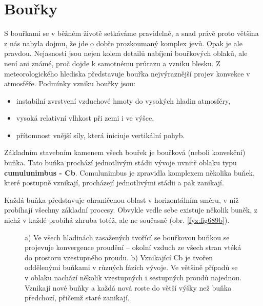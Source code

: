   \section{Bouřky}\label{fyz:IIchapIXsecIV}   
    S bouřkami se v běžném životě setkáváme pravidelně, a snad právě proto většina z nás nabyla
    dojmu, že jde o dobře prozkoumaný komplex jevů. Opak je ale pravdou. Nejasnosti jsou nejen kolem
    detailů nabíjení bouřkových oblaků, ale není ani známé, proč dojde k samotnému průrazu a vzniku
    blesku. Z meteorologického hlediska představuje bouřka nejvýraznější projev konvekce v
    atmosféře. Podmínky vzniku bouřky jsou:
    \begin{itemize}[noitemsep]
      \item instabilní zvrstvení vzduchové hmoty do vysokých hladin atmosféry,
      \item vysoká relativní vlhkost při zemi i ve výšce,
      \item přítomnost vnější síly, která iniciuje vertikální pohyb.
    \end{itemize}
    Základním stavebním kamenem všech bouřek je bouřková (neboli konvekční) buňka. Tato buňka
    prochází jednotlivým stádii vývoje uvnitř oblaku typu \textbf{cumulunimbus - Cb}. Comulunimbus
    je zpravidla komplexem několika buňek, které postupně vznikají, procházejí jednotlivými stádii
    a pak zanikají. 

    Každá buňka představuje ohraničenou oblast v horizontálním směru, v níž probíhají všechny
    základní procesy. Obvykle vedle sebe existuje několik buněk, z nichž v každé probíhá zhruba
    totéž, ale ne současně (obr. \ref{fyz:fig689b}). 

    \begin{figure}[ht!]
      \centering
      \hspace{1em} 
      \caption{a) Ve všech hladinách zasažených tvořící se bouřkovou buňkou se projevuje
      konvergence proudění – okolní vzduch ze všech stran vtéká do prostoru vzestupného proudu. b)
      Vznikající Cb je tvořen oddělenými buňkami v různých fázích vývoje. Ve většině případů se v
      oblaku nachází několik vzestupných i sestupných proudů najednou. Vznikají nové buňky a každá
      nová roste do větší výšky než buňka předchozí, přičemž staré zanikají.}
      \label{fyz:fig937}
    \end{figure}
    
